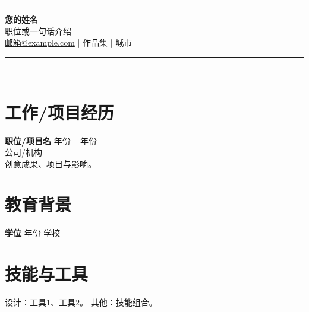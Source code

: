 \documentclass[11pt,a4paper]{article}
\begin{document}
\begin{center}\rule{2.2cm}{2.8cm}\end{center}
\begin{center}
{\LARGE \textbf{您的姓名}}\\[0.15em]
{\color{gray} 职位或一句话介绍}\\[0.4em]
\href{mailto:邮箱@example.com}{邮箱@example.com} \quad | \quad 作品集 \quad | \quad 城市
\end{center}

\vspace{0.5em}
\noindent\rule{\textwidth}{1pt}\\[0.3em]

\section*{工作/项目经历}
\textbf{职位/项目名} \hfill 年份 -- 年份 \\
公司/机构 \\
创意成果、项目与影响。

\section*{教育背景}
\textbf{学位} \hfill 年份 \quad 学校

\section*{技能与工具}
设计：工具1、工具2。 \quad 其他：技能组合。
\end{document}
